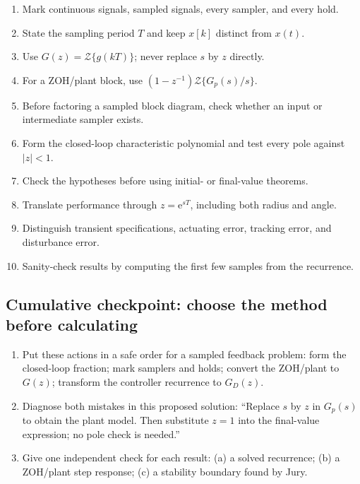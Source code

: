 \documentclass[11pt]{article}
\newcommand{\Z}{\mathcal{Z}}
\newcommand{\e}{\mathrm{e}}
\begin{document}
{\small
\begin{enumerate}
  \item Mark continuous signals, sampled signals, every sampler, and every hold.
  \item State the sampling period $T$ and keep $x[k]$ distinct from $x(t)$.
  \item Use $G(z)=\Z\{g(kT)\}$; never replace $s$ by $z$ directly.
  \item For a ZOH/plant block, use $(1-z^{-1})\Z\{G_p(s)/s\}$.
  \item Before factoring a sampled block diagram, check whether an input or intermediate sampler exists.
  \item Form the closed-loop characteristic polynomial and test every pole against $|z|<1$.
  \item Check the hypotheses before using initial- or final-value theorems.
  \item Translate performance through $z=\e^{sT}$, including both radius and angle.
  \item Distinguish transient specifications, actuating error, tracking error, and disturbance error.
  \item Sanity-check results by computing the first few samples from the recurrence.
\end{enumerate}
}

\subsection*{Cumulative checkpoint: choose the method before calculating}

\begin{enumerate}[label=\textbf{Q\arabic*.},wide]
  \item Put these actions in a safe order for a sampled feedback problem: form the closed-loop fraction; mark samplers and holds; convert the ZOH/plant to $G(z)$; transform the controller recurrence to $G_D(z)$.
  \item Diagnose both mistakes in this proposed solution: ``Replace $s$ by $z$ in $G_p(s)$ to obtain the plant model. Then substitute $z=1$ into the final-value expression; no pole check is needed.''
  \item Give one independent check for each result: (a) a solved recurrence; (b) a ZOH/plant step response; (c) a stability boundary found by Jury.
\end{enumerate}
\end{document}
